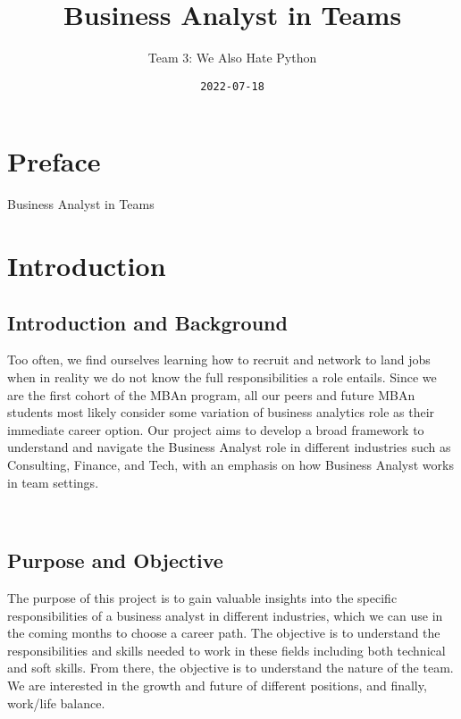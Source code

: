 \documentclass[
]{book}
\title{Business Analyst in Teams}
\author{Team 3: We Also Hate Python}
\date{\texttt{2022-07-18}}
\begin{document}
\maketitle

{
\setcounter{tocdepth}{1}
\tableofcontents
}
\hypertarget{preface}{%
\chapter{Preface}\label{preface}}

Business Analyst in Teams

\hypertarget{introduction}{%
\chapter{Introduction}\label{introduction}}

\hypertarget{introduction-and-background}{%
\section{\texorpdfstring{\textbf{Introduction and Background}}{Introduction and Background}}\label{introduction-and-background}}

Too often, we find ourselves learning how to recruit and network to land jobs when in reality we do not know the full responsibilities a role entails. Since we are the first cohort of the MBAn program, all our peers and future MBAn students most likely consider some variation of business analytics role as their immediate career option. Our project aims to develop a broad framework to understand and navigate the Business Analyst role in different industries such as Consulting, Finance, and Tech, with an emphasis on how Business Analyst works in team settings.

~

\hypertarget{purpose-and-objective}{%
\section{\texorpdfstring{\textbf{Purpose and Objective}}{Purpose and Objective}}\label{purpose-and-objective}}

The purpose of this project is to gain valuable insights into the specific responsibilities of a business analyst in different industries, which we can use in the coming months to choose a career path. The objective is to understand the responsibilities and skills needed to work in these fields including both technical and soft skills. From there, the objective is to understand the nature of the team. We are interested in the growth and future of different positions, and finally, work/life balance.
\end{document}
